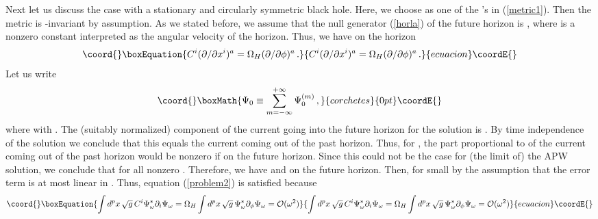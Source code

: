 \documentclass[a4paper,12pt]{article}
\begin{document}
Next let us discuss the case with a stationary and circularly symmetric
black hole.
Here, we choose \myHighlight{$\phi$}\coordHE{} as one
of the \coordHE{}'s in (\ref{metric1}).  Then the metric \coordHE{} 
is \myHighlight{$\phi$}\coordHE{}-invariant by assumption.
As we stated before, we assume that the null generator (\ref{horla}) of the
future horizon is 
\coordHE{}, where
\coordHE{} is a nonzero constant interpreted as the angular velocity of the
horizon.  Thus, we have on the horizon
\begin{equation}\coord{}\boxEquation{
C^i (\partial/\partial x^i)^a =
\Omega_H (\partial/\partial \phi)^a\,. \label{const}
}{
C^i (\partial/\partial x^i)^a =
\Omega_H (\partial/\partial \phi)^a\,. }{ecuacion}\coordE{}\end{equation}
Let us write 
\[\coord{}\boxMath{
\Psi_0 \equiv \sum_{m=-\infty}^{+\infty} \Psi_0^{(m)}\,,
}{corchetes}{0pt}\coordE{}\]
where \coordHE{} with 
\myHighlight{$\partial_\phi = \partial/\partial \phi$}\coordHE{}.
The (suitably normalized)
component of the current going into the future horizon for the solution
\coordHE{} is
\coordHE{}. 
By time independence of the solution we conclude that this equals
the current coming out of the past horizon.
Thus, for \coordHE{}, the part proportional to \coordHE{} of the
current coming out of the past horizon would be nonzero
if \coordHE{} on the future horizon.  
Since this could not be the case
for (the \coordHE{} limit of) the APW solution,
we conclude that \coordHE{} for all nonzero \coordHE{}.
Therefore, we have \coordHE{} and
\coordHE{} on the future horizon.
Then, \coordHE{} for small \myHighlight{$\omega$}\coordHE{} 
by the assumption that the error term is at most linear in \myHighlight{$\omega$}\coordHE{}.  Thus,
equation (\ref{problem2}) is satisfied because 
\begin{equation}\coord{}\boxEquation{
\int d^{p}x\,\sqrt{g}\,C^i\Psi_\omega^* \partial_i \Psi_\omega
= \Omega_H
\int d^{p}x\,\sqrt{g}\,\Psi_\omega^*\partial_\phi \Psi_\omega \nonumber
 =  {\cal O}(\omega^2)
}{
\int d^{p}x\,\sqrt{g}\,C^i\Psi_\omega^* \partial_i \Psi_\omega
= \Omega_H
\int d^{p}x\,\sqrt{g}\,\Psi_\omega^*\partial_\phi \Psi_\omega \nonumber
 =  {\cal O}(\omega^2)
}{ecuacion}\coordE{}\end{equation}
\end{document}
